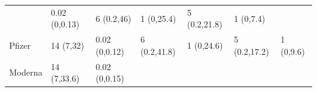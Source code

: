 \documentclass[
]{article}
\begin{document}
\begin{longtable}[]{@{}lllllll@{}}
\begin{minipage}[t]{0.12\columnwidth}
\end{minipage} & \begin{minipage}[t]{0.10\columnwidth}\raggedright
0.02 (0,0.13)\strut
\end{minipage} & \begin{minipage}[t]{0.11\columnwidth}\raggedright
6 (0.2,46)\strut
\end{minipage} & \begin{minipage}[t]{0.11\columnwidth}\raggedright
1 (0,25.4)\strut
\end{minipage} & \begin{minipage}[t]{0.09\columnwidth}\raggedright
5 (0.2,21.8)\strut
\end{minipage} & \begin{minipage}[t]{0.10\columnwidth}\raggedright
1 (0,7.4)\strut
\end{minipage}\tabularnewline
\begin{minipage}[t]{0.18\columnwidth}\raggedright
Pfizer\strut
\end{minipage} & \begin{minipage}[t]{0.12\columnwidth}\raggedright
14 (7,32)\strut
\end{minipage} & \begin{minipage}[t]{0.10\columnwidth}\raggedright
0.02 (0,0.12)\strut
\end{minipage} & \begin{minipage}[t]{0.11\columnwidth}\raggedright
6 (0.2,41.8)\strut
\end{minipage} & \begin{minipage}[t]{0.11\columnwidth}\raggedright
1 (0,24.6)\strut
\end{minipage} & \begin{minipage}[t]{0.09\columnwidth}\raggedright
5 (0.2,17.2)\strut
\end{minipage} & \begin{minipage}[t]{0.10\columnwidth}\raggedright
1 (0,9.6)\strut
\end{minipage}\tabularnewline
\begin{minipage}[t]{0.18\columnwidth}\raggedright
Moderna\strut
\end{minipage} & \begin{minipage}[t]{0.12\columnwidth}\raggedright
14 (7,33.6)\strut
\end{minipage} & \begin{minipage}[t]{0.10\columnwidth}\raggedright
0.02 (0,0.15)\strut
\end{minipage} & \begin{minipage}[t]{0.11\columnwidth}\raggedright

\end{minipage}
\end{longtable}
\end{document}
